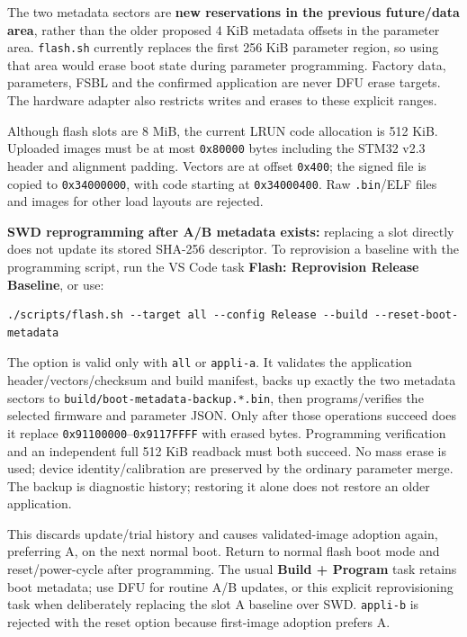 \documentclass[10pt,a4paper,oneside]{report}
\begin{document}
The two metadata sectors are \textbf{new reservations in the previous future/data area}, rather than the older proposed 4 KiB metadata offsets in the parameter area. \texttt{flash.\allowbreak{}sh} currently replaces the first 256 KiB parameter region, so using that area would erase boot state during parameter programming. Factory data, parameters, FSBL and the confirmed application are never DFU erase targets. The hardware adapter also restricts writes and erases to these explicit ranges.

Although flash slots are 8 MiB, the current LRUN code allocation is 512 KiB. Uploaded images must be at most \texttt{0x80000} bytes including the STM32 v2.3 header and alignment padding. Vectors are at offset \texttt{0x400}; the signed file is copied to \texttt{0x34000000}, with code starting at \texttt{0x34000400}. Raw \texttt{.\allowbreak{}bin}/ELF files and images for other load layouts are rejected.

\textbf{SWD reprogramming after A/B metadata exists:} replacing a slot directly does not update its stored SHA-256 descriptor. To reprovision a baseline with the programming script, run the VS Code task \textbf{Flash: Reprovision Release Baseline}, or use:

\begin{verbatim}
./scripts/flash.sh --target all --config Release --build --reset-boot-metadata
\end{verbatim}

The option is valid only with \texttt{all} or \texttt{appli-\allowbreak{}a}. It validates the application header/vectors/checksum and build manifest, backs up exactly the two metadata sectors to \texttt{build/\allowbreak{}boot-\allowbreak{}metadata-\allowbreak{}backup.\allowbreak{}*.\allowbreak{}bin}, then programs/verifies the selected firmware and parameter JSON. Only after those operations succeed does it replace \texttt{0x91100000}--\texttt{0x9117FFFF} with erased bytes. Programming verification and an independent full 512 KiB readback must both succeed. No mass erase is used; device identity/calibration are preserved by the ordinary parameter merge. The backup is diagnostic history; restoring it alone does not restore an older application.

This discards update/trial history and causes validated-image adoption again, preferring A, on the next normal boot. Return to normal flash boot mode and reset/power-cycle after programming. The usual \textbf{Build + Program} task retains boot metadata; use DFU for routine A/B updates, or this explicit reprovisioning task when deliberately replacing the slot A baseline over SWD. \texttt{appli-\allowbreak{}b} is rejected with the reset option because first-image adoption prefers A.
\end{document}
